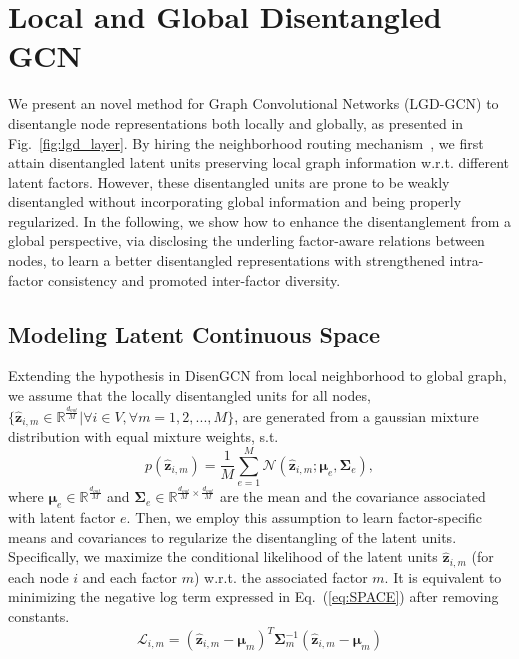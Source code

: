 \documentclass[accepted]{uai2021} %
\begin{document}
\section{Local and Global Disentangled GCN}
We present an novel method for Graph Convolutional Networks (LGD-GCN) to disentangle node representations both locally and globally, as presented in Fig.~\ref{fig:lgd_layer}. By hiring the neighborhood routing mechanism~\citep{Ma2019DisentangledGC}, we first attain disentangled latent units preserving local graph information w.r.t. different latent factors. However, these disentangled units are prone to be weakly disentangled without incorporating global information and being properly regularized. In the following, we show how to enhance the disentanglement from a global perspective, via disclosing the underling factor-aware relations between nodes, to learn a better disentangled representations with strengthened intra-factor consistency and promoted inter-factor diversity.

\subsection{Modeling Latent Continuous Space}
Extending the hypothesis in DisenGCN from local neighborhood to global graph, we assume that the locally disentangled units for all nodes, $\{\hat{\mathbf{z}}_{i, m} \in \mathbb{R}^{\frac{d_{out}}{M}}| \forall i \in V, \forall m = 1,2,...,M\}$, are generated from a gaussian mixture distribution with equal mixture weights, s.t.
\begin{equation} \label{eq:gmd}
p(\hat{\mathbf{z}}_{i,m}) = \frac{1}{M}\sum^M_{e=1}\mathcal{N}(\hat{\mathbf{z}}_{i,m};\boldsymbol{\mu}_e, \boldsymbol{\Sigma}_e),
\end{equation}
where $\boldsymbol{\mu}_e \in \mathbb{R}^{\frac{d_{out}}{M}}$ and $\boldsymbol{\Sigma}_e \in \mathbb{R}^{\frac{d_{out}}{M}\times \frac{d_{out}}{M}}$ are the mean and the covariance associated with latent factor $e$. Then, we employ this assumption to learn factor-specific means and covariances to regularize the disentangling of the latent units. Specifically, we maximize the conditional likelihood of the latent units $\hat{\mathbf{z}}_{i,m}$ (for each node $i$ and each factor $m$) w.r.t. the associated factor $m$. It is equivalent to minimizing the negative log term expressed in Eq.~(\ref{eq:SPACE}) after removing constants.
\begin{equation} \label{eq:SPACE}
\mathcal{L}_{i,m} = (\hat{\mathbf{z}}_{i,m}-\boldsymbol{\mu}_m)^T\boldsymbol{\Sigma}_m^{-1}(\hat{\mathbf{z}}_{i,m}-\boldsymbol{\mu}_m)
\end{equation}
\end{document}
